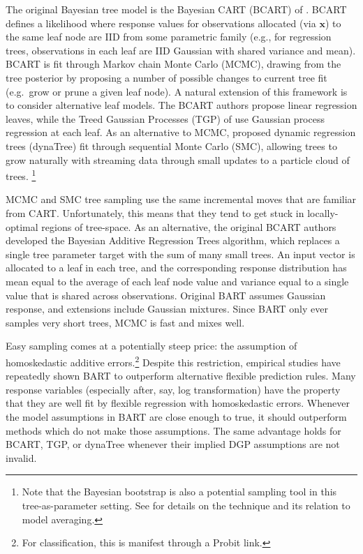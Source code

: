\documentclass{article}
\begin{document}
The original Bayesian tree model is the Bayesian CART (BCART) of
\citet{chipman_bayesian_1998}.
BCART defines a likelihood where response values for  observations  allocated
(via $\mathbf{x}$) to the same leaf node are IID from some parametric family
(e.g., for regression trees, observations in each leaf are IID Gaussian with
shared variance and mean).   BCART is fit through Markov chain Monte Carlo (MCMC), drawing from the
tree posterior by proposing a number of possible
changes to current tree fit (e.g.~grow or prune a given leaf node). A natural
extension of this framework is to consider alternative leaf models. The  BCART
authors propose linear regression leaves, while the Treed Gaussian
Processes (TGP) of \citet{gramacy_bayesian_2008} use Gaussian process
regression at each leaf. As an alternative to MCMC,
\citet{taddy_dynamic_2011} proposed dynamic regression trees (dynaTree)
fit through sequential Monte Carlo (SMC), allowing trees to grow naturally
with streaming data through small updates to a particle cloud of trees.
\footnote{Note that the Bayesian bootstrap is also a potential sampling tool in this tree-as-parameter setting. 
See \citet{clyde_bagging_2001} for details on the technique and its
relation to model averaging.}

MCMC and SMC tree sampling use the same incremental moves that are familiar
from CART. Unfortunately, this means that they tend to get stuck in
locally-optimal regions of tree-space.  As an alternative,
the original BCART authors developed the Bayesian Additive Regression Trees
\citet[BART;][]{chipman_bart:_2010} algorithm, which replaces a single tree
parameter target with the sum of many small trees. An input vector is
allocated to a leaf in each  tree, and the corresponding response
distribution has mean equal to the average of each leaf node value and
variance equal to a single  value that is shared across observations. Original
BART assumes Gaussian response, and extensions include Gaussian mixtures. Since BART
only ever samples very short trees, MCMC is fast and mixes well.  

Easy
sampling comes at a potentially steep price: the assumption of homoskedastic
additive errors.\footnote{For classification, this is manifest  through a
Probit link.} Despite this restriction, empirical studies have repeatedly shown BART to outperform
alternative flexible prediction rules. Many response variables 
(especially after, say, log transformation) have the property that they are well fit by
 flexible regression with homoskedastic errors.  Whenever the model
 assumptions in BART are close enough to true, it should outperform  methods which do not make those assumptions.  The same advantage
 holds for  BCART, TGP, or dynaTree whenever their implied DGP
 assumptions are not invalid.
\end{document}

